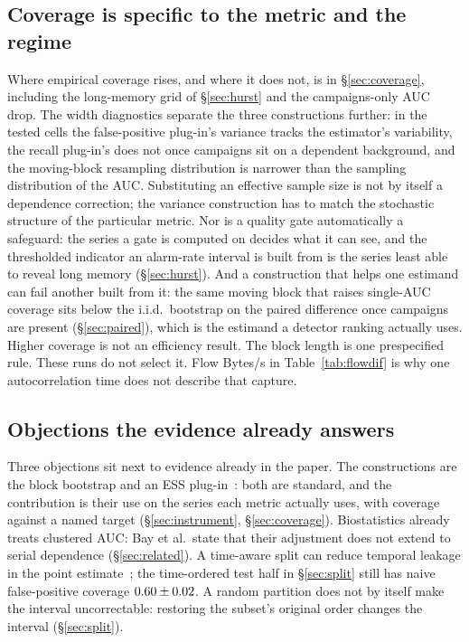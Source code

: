 \documentclass[a4paper,fleqn]{cas-dc}
\begin{document}
\subsection{Coverage is specific to the metric and the regime}
Where empirical coverage rises, and where it does not, is in \S\ref{sec:coverage}, including the
long-memory grid of \S\ref{sec:hurst} and the campaigns-only AUC drop. The width diagnostics separate the three
constructions further: in the tested cells the false-positive plug-in's variance tracks the
estimator's variability, the recall plug-in's does not once campaigns sit on a dependent
background, and the moving-block resampling distribution is narrower than the sampling
distribution of the AUC. Substituting an effective sample size is not by itself a dependence
correction; the variance construction has to match the stochastic structure of the particular
metric. Nor is a quality gate automatically a safeguard: the series a gate is computed on decides
what it can see, and the thresholded indicator an alarm-rate interval is built from is the series
least able to reveal long memory (\S\ref{sec:hurst}). And a construction that helps one estimand
can fail another built from it: the same moving block that raises single-AUC coverage sits below
the i.i.d.\ bootstrap on the paired difference once campaigns are present (\S\ref{sec:paired}),
which is the estimand a detector ranking actually uses. Higher coverage is not an efficiency result.
The block length is one prespecified rule. These runs do not select it. Flow Bytes/s in
Table~\ref{tab:flowdif} is why one autocorrelation time does not describe that capture.

\subsection{Objections the evidence already answers}
Three objections sit next to evidence already in the paper. The constructions are the block
bootstrap and an ESS plug-in~\citep{kunsch1989jackknife,geyer1992practical}: both are standard, and the contribution is their use on the series
each metric actually uses, with coverage against a named target (\S\ref{sec:instrument},
\S\ref{sec:coverage}). Biostatistics already treats clustered AUC: Bay et al.\ state that their
adjustment does not extend to serial dependence (\S\ref{sec:related}). A time-aware split can
reduce temporal leakage in the point estimate~\citep{arp2022dos,pendlebury2019tesseract}; the time-ordered test half in \S\ref{sec:split} still
has naive false-positive coverage $0.60\pm0.02$. A random partition does not by itself make
the interval uncorrectable: restoring the subset's original order changes the interval
(\S\ref{sec:split}).
\end{document}
